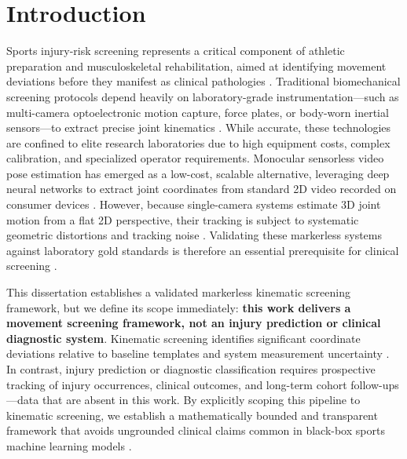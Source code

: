 \chapter{Introduction}
\label{ch:intro}



Sports injury-risk screening represents a critical component of athletic preparation and musculoskeletal rehabilitation, aimed at identifying movement deviations before they manifest as clinical pathologies \citep{Bahr_2016}. Traditional biomechanical screening protocols depend heavily on laboratory-grade instrumentation—such as multi-camera optoelectronic motion capture, force plates, or body-worn inertial sensors—to extract precise joint kinematics \citep{Mundt_2019}. While accurate, these technologies are confined to elite research laboratories due to high equipment costs, complex calibration, and specialized operator requirements. Monocular sensorless video pose estimation has emerged as a low-cost, scalable alternative, leveraging deep neural networks to extract joint coordinates from standard 2D video recorded on consumer devices \citep{OpenCap_2022} \citep{MP_2020}. However, because single-camera systems estimate 3D joint motion from a flat 2D perspective, their tracking is subject to systematic geometric distortions and tracking noise \citep{Colyer_2018}. Validating these markerless systems against laboratory gold standards is therefore an essential prerequisite for clinical screening \citep{open_source_poses_2021}.

This dissertation establishes a validated markerless kinematic screening framework, but we define its scope immediately: \textbf{this work delivers a movement screening framework, not an injury prediction or clinical diagnostic system}. Kinematic screening identifies significant coordinate deviations relative to baseline templates and system measurement uncertainty \citep{Bahr_2016}. In contrast, injury prediction or diagnostic classification requires prospective tracking of injury occurrences, clinical outcomes, and long-term cohort follow-ups—data that are absent in this work. By explicitly scoping this pipeline to kinematic screening, we establish a mathematically bounded and transparent framework that avoids ungrounded clinical claims common in black-box sports machine learning models \citep{Halilaj_2018}.




